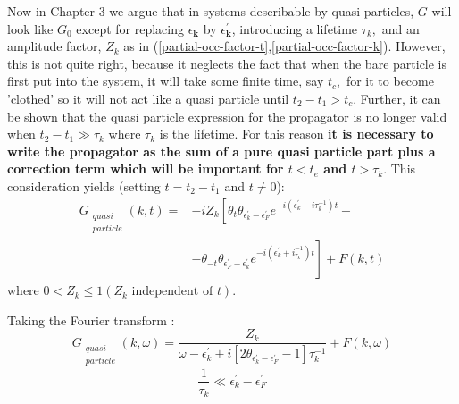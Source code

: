 Now in Chapter 3 we argue that in systems describable by quasi particles, $G$ will look like $G_{0}$ except for replacing $\epsilon_{\mathbf{k}}$ by $\epsilon_{\mathbf{k}}^{\prime}$, introducing a lifetime $\tau_{k},$ and an amplitude factor, $Z_{k}$ as in (\ref{partial-occ-factor-t},\ref{partial-occ-factor-k}). However, this is not quite right, because it neglects the fact that when the bare particle is first put into the system, it will take some finite time, say $t_{c},$ for it to become 'clothed' so it will not act like a quasi particle until $t_{2}-t_{1}>t_{c} .$ Further, it can be shown that the quasi particle expression for the propagator is no longer valid when $t_{2}-t_{1} \gg \tau_{k}$ where $\tau_{k}$ is the lifetime. For this reason \textbf{it is necessary to write the propagator as the sum of a pure quasi particle part plus a correction term which will be important for $t<t_{e}$ and $t>\tau_{k}$}. This consideration yields (setting $t=t_2-t_1$ and $t\neq0$):
\begin{equation}\begin{aligned}
G_{\substack{quasi\\particle}}(k, t)=&-i Z_{k}\left[\theta_{t} \theta_{\epsilon^{\prime}_{k}-\epsilon^{\prime}_F} e^{-i\left(\epsilon_{k}^{\prime}-i \tau_{k}^{-1}\right) t}-\right.\\
&\left.-\theta_{-t} \theta_{\epsilon^{\prime}_F-\epsilon_{k}^{\prime}} e^{-i\left(\epsilon_{k}^{\prime}+i_{\tau_{k}}^{-1}\right)t}\right]+F(k, t)
\end{aligned}\end{equation}
where $0<Z_{k} \leqslant 1\left(Z_{k} \text { independent of } t\right)$. 

Taking the Fourier transform :
\begin{equation}G_{\substack{quasi\\particle}}(k, \omega)=\frac{Z_{k}}{\omega-\epsilon_{k}^{\prime}+i\left[2 \theta_{\epsilon^{\prime}_{k}-\epsilon_F^{\prime}}-1\right] \tau_{k}^{-1}}+F(k, \omega)\end{equation}
\begin{equation}\frac{1}{\tau_{k}} \ll \epsilon_{k}^{\prime}-\epsilon_{F}^{\prime}\end{equation}